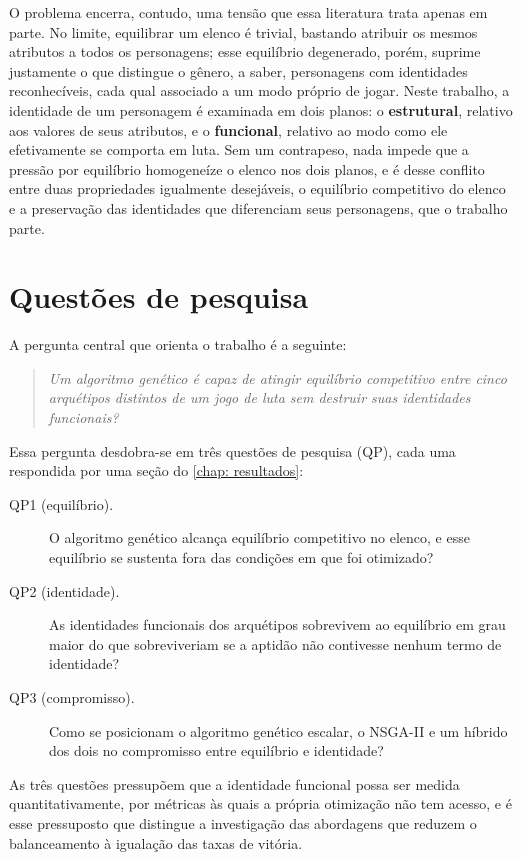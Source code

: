 O problema encerra, contudo, uma tensão que essa literatura trata apenas em parte. No limite, equilibrar um elenco é trivial, bastando atribuir os mesmos atributos a todos os personagens; esse equilíbrio degenerado, porém, suprime justamente o que distingue o gênero, a saber, personagens com identidades reconhecíveis, cada qual associado a um modo próprio de jogar. Neste trabalho, a identidade de um personagem é examinada em dois planos: o \textbf{estrutural}, relativo aos valores de seus atributos, e o \textbf{funcional}, relativo ao modo como ele efetivamente se comporta em luta. Sem um contrapeso, nada impede que a pressão por equilíbrio homogeneíze o elenco nos dois planos, e é desse conflito entre duas propriedades igualmente desejáveis, o equilíbrio competitivo do elenco e a preservação das identidades que diferenciam seus personagens, que o trabalho parte.

\section{Questões de pesquisa}
\label{sec: questoes}

A pergunta central que orienta o trabalho é a seguinte:

\begin{quote}
    \textit{Um algoritmo genético é capaz de atingir equilíbrio competitivo entre cinco arquétipos distintos de um jogo de luta sem destruir suas identidades funcionais?}
\end{quote}

Essa pergunta desdobra-se em três questões de pesquisa (QP), cada uma respondida por uma seção do \autoref{chap: resultados}:

\begin{description}
    \item[QP1 (equilíbrio).] O algoritmo genético alcança equilíbrio competitivo no elenco, e esse equilíbrio se sustenta fora das condições em que foi otimizado?
    \item[QP2 (identidade).] As identidades funcionais dos arquétipos sobrevivem ao equilíbrio em grau maior do que sobreviveriam se a aptidão não contivesse nenhum termo de identidade?
    \item[QP3 (compromisso).] Como se posicionam o algoritmo genético escalar, o NSGA-II \cite{deb2002nsga} e um híbrido dos dois no compromisso entre equilíbrio e identidade?
\end{description}

As três questões pressupõem que a identidade funcional possa ser medida quantitativamente, por métricas às quais a própria otimização não tem acesso, e é esse pressuposto que distingue a investigação das abordagens que reduzem o balanceamento à igualação das taxas de vitória.


